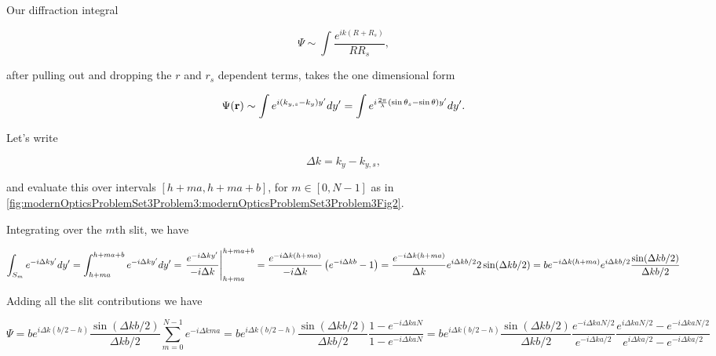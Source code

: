 {Our diffraction integral

\begin{dmath}\label{eqn:modernOptics:problemSet3:3:160}
\Psi \sim \int \frac{e^{i k (R + R_s)}}{ R R_s},
\end{dmath}

after pulling out and dropping the $r$ and $r_s$ dependent terms, takes the one dimensional form

\begin{dmath}\label{eqn:modernOptics:problemSet3:3:180}
\Psi(\Br) \sim \int e^{i (k_{y,s} - k_{y}) y' } dy'
=
\int e^{i \frac{2 \pi}{\lambda} (\sin\theta_s - \sin\theta) y' } dy'.
\end{dmath}

Let's write

\begin{dmath}\label{eqn:modernOptics:problemSet3:3:200}
\Delta k = k_{y} - k_{y,s},
\end{dmath}

and evaluate this over intervals $[h + m a, h + m a + b]$, for $m \in [0, N-1]$ as in \cref{fig:modernOpticsProblemSet3Problem3:modernOpticsProblemSet3Problem3Fig2}.


Integrating over the $m$th slit, we have

\begin{dmath}\label{eqn:modernOptics:problemSet3:3:220}
\int_{S_m} e^{-i \Delta k y' } dy'
=
\int_{h + m a }^{h + m a + b} e^{-i \Delta k y' } dy'
=
\evalrange{\frac{e^{-i \Delta k y' }}{-i \Delta k }}
{h + m a }{h + m a + b}
=
\frac{e^{-i \Delta k (h + m a) }}{-i \Delta k }
\left( e^{-i \Delta k b } - 1 \right)
=
\frac{e^{-i \Delta k (h + m a ) }}{\Delta k }
e^{i \Delta k b/2 } 2 \sin( \Delta k b/2 )
=
b e^{-i \Delta k (h + m a ) }
e^{i \Delta k b/2 } \frac{\sin( \Delta k b/2 )}{ \Delta k b/2}
\end{dmath}

Adding all the slit contributions we have

\begin{dmath}\label{eqn:modernOptics:problemSet3:3:240}
\Psi =
b
e^{i \Delta k (b/2 -h) }
\frac{\sin( \Delta k b/2 )}{ \Delta k b/2}
\sum_{m = 0}^{N-1}
e^{-i \Delta k m a }
=
b
e^{i \Delta k (b/2 -h) }
\frac{\sin( \Delta k b/2 )}{ \Delta k b/2}
\frac{1 - e^{-i \Delta k a N }}
{1 - e^{-i \Delta k a N }}
=
b
e^{i \Delta k (b/2 -h) }
\frac{\sin( \Delta k b/2 )}{ \Delta k b/2}
\frac
{
e^{-i \Delta k a N/2 }
}
{
e^{-i \Delta k a /2 }
}
\frac
{
e^{i \Delta k a N/2 } - e^{-i \Delta k a N/2 }
}
{
e^{i \Delta k a /2 } - e^{-i \Delta k a /2 }
}
\end{dmath}

}
